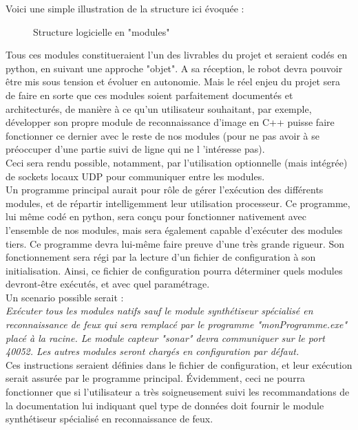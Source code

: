 		\vspace{15pt}

		Voici une simple illustration de la structure ici évoquée :
		\begin{figure}[H]
			\centering
			
			\vspace{10pt}
			\caption{Structure logicielle en "modules"}
		\end{figure}

		Tous ces modules constitueraient l'un des livrables du projet et seraient codés en python, en suivant une approche "objet". A sa réception, le robot devra pouvoir être mis sous tension et évoluer en autonomie. Mais le réel enjeu du projet sera de faire en sorte que ces modules soient parfaitement documentés et architecturés, de manière à ce qu'un utilisateur souhaitant, par exemple, développer son propre module de reconnaissance d'image en C++ puisse faire fonctionner ce dernier avec le reste de nos modules (pour ne pas avoir à se préoccuper d'une partie suivi de ligne qui ne l 'intéresse pas).\\
		Ceci sera rendu possible, notamment, par l'utilisation optionnelle (mais intégrée) de sockets locaux UDP pour communiquer entre les modules.\\

		Un programme principal aurait pour rôle de gérer l’exécution des différents modules, et de répartir intelligemment leur utilisation processeur. Ce programme, lui même codé en python, sera conçu pour fonctionner nativement avec l'ensemble de nos modules, mais sera également capable d’exécuter des modules tiers. Ce programme devra lui-même faire preuve d'une très grande rigueur. Son fonctionnement sera régi par la lecture d'un fichier de configuration à son initialisation. Ainsi, ce fichier de configuration pourra déterminer quels modules devront-être exécutés, et avec quel paramétrage.\\

		Un scenario possible serait :\\
		\textit{Exécuter tous les modules natifs sauf le module synthétiseur spécialisé en reconnaissance de feux qui sera remplacé par le programme "monProgramme.exe" placé à la racine. Le module capteur "sonar" devra communiquer sur le port 40052. Les autres modules seront chargés en configuration par défaut.}\\
		Ces instructions seraient définies dans le fichier de configuration, et leur exécution serait assurée par le programme principal. Évidemment, ceci ne pourra fonctionner que si l'utilisateur a très soigneusement suivi les recommandations de la documentation lui indiquant quel type de données doit fournir le module synthétiseur spécialisé en reconnaissance de feux.\\

